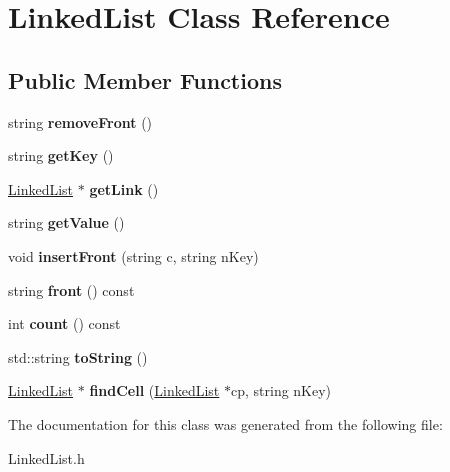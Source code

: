 \hypertarget{class_linked_list}{}\section{Linked\+List Class Reference}
\label{class_linked_list}
\subsection*{Public Member Functions}
\begin{DoxyCompactItemize}
\item 
\hypertarget{class_linked_list_a390a545ff1735d9e3bf92fb2c47b7e59}{}string {\bfseries remove\+Front} ()\label{class_linked_list_a390a545ff1735d9e3bf92fb2c47b7e59}

\item 
\hypertarget{class_linked_list_a49a1ac6879c926e92c1fd1ca3705c514}{}string {\bfseries get\+Key} ()\label{class_linked_list_a49a1ac6879c926e92c1fd1ca3705c514}

\item 
\hypertarget{class_linked_list_a4934fadd7115b28c63ea8ee855519856}{}\hyperlink{class_linked_list}{Linked\+List} $\ast$ {\bfseries get\+Link} ()\label{class_linked_list_a4934fadd7115b28c63ea8ee855519856}

\item 
\hypertarget{class_linked_list_abb803decf42c44f519c7f03c61fd39d9}{}string {\bfseries get\+Value} ()\label{class_linked_list_abb803decf42c44f519c7f03c61fd39d9}

\item 
\hypertarget{class_linked_list_abe30ff722b55431b67988b79a9216113}{}void {\bfseries insert\+Front} (string c, string n\+Key)\label{class_linked_list_abe30ff722b55431b67988b79a9216113}

\item 
\hypertarget{class_linked_list_a6b805e1478600b79289a7c2b78d0ea4e}{}string {\bfseries front} () const \label{class_linked_list_a6b805e1478600b79289a7c2b78d0ea4e}

\item 
\hypertarget{class_linked_list_af3fb45269e96804105711392959ff9f9}{}int {\bfseries count} () const \label{class_linked_list_af3fb45269e96804105711392959ff9f9}

\item 
\hypertarget{class_linked_list_a43beba648f452d017240d00a6e0d31a9}{}std\+::string {\bfseries to\+String} ()\label{class_linked_list_a43beba648f452d017240d00a6e0d31a9}

\item 
\hypertarget{class_linked_list_a24864641a01df72ecf1500c01c6e3149}{}\hyperlink{class_linked_list}{Linked\+List} $\ast$ {\bfseries find\+Cell} (\hyperlink{class_linked_list}{Linked\+List} $\ast$cp, string n\+Key)\label{class_linked_list_a24864641a01df72ecf1500c01c6e3149}

\end{DoxyCompactItemize}


The documentation for this class was generated from the following file\+:\begin{DoxyCompactItemize}
\item 
Linked\+List.\+h\end{DoxyCompactItemize}

